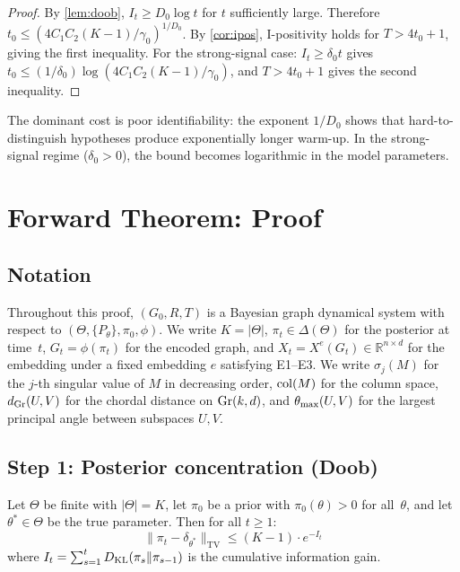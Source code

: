 \documentclass{../shared/primo}
\begin{document}
\begin{proof}
By \cref{lem:doob}, $I_t \geq D_0 \log t$ for $t$ sufficiently large. Therefore $t_0 \leq (4C_1 C_2 (K{-}1)/\gamma_0)^{1/D_0}$. By \cref{cor:ipos}, I-positivity holds for $T > 4t_0 + 1$, giving the first inequality. For the strong-signal case: $I_t \geq \delta_0 t$ gives $t_0 \leq (1/\delta_0) \log(4C_1 C_2(K{-}1)/\gamma_0)$, and $T > 4t_0 + 1$ gives the second inequality.
\end{proof}

\begin{remark}
The dominant cost is poor identifiability: the exponent $1/D_0$ shows that hard-to-distinguish hypotheses produce exponentially longer warm-up. In the strong-signal regime ($\delta_0 > 0$), the bound becomes logarithmic in the model parameters.
\end{remark}


\section{Forward Theorem: Proof}
\label{sec:forward}

\subsection{Notation}

Throughout this proof, $(G_0, R, T)$ is a Bayesian graph dynamical system with respect to $(\Theta, \{P_\theta\}, \pi_0, \phi)$. We write $K = |\Theta|$, $\pi_t \in \Delta(\Theta)$ for the posterior at time~$t$, $G_t = \phi(\pi_t)$ for the encoded graph, and $X_t = X^e(G_t) \in \mathbb{R}^{n \times d}$ for the embedding under a fixed embedding $e$ satisfying E1--E3. We write $\sigma_j(M)$ for the $j$-th singular value of $M$ in decreasing order, $\operatorname{col}(M)$ for the column space, $d_{\mathrm{Gr}}(U, V)$ for the chordal distance on $\operatorname{Gr}(k, d)$, and $\theta_{\max}(U, V)$ for the largest principal angle between subspaces $U, V$.

\subsection{Step 1: Posterior concentration (Doob)}

\begin{lemma}\label{lem:doob}
Let $\Theta$ be finite with $|\Theta| = K$, let $\pi_0$ be a prior with $\pi_0(\theta) > 0$ for all~$\theta$, and let $\theta^* \in \Theta$ be the true parameter. Then for all $t \geq 1$:
\[
\|\pi_t - \delta_{\theta^*}\|_{\mathrm{TV}} \leq (K - 1) \cdot e^{-I_t}
\]
where $I_t = \sum_{s=1}^{t} D_{\mathrm{KL}}(\pi_s \| \pi_{s-1})$ is the cumulative information gain.
\end{lemma}
\end{document}
